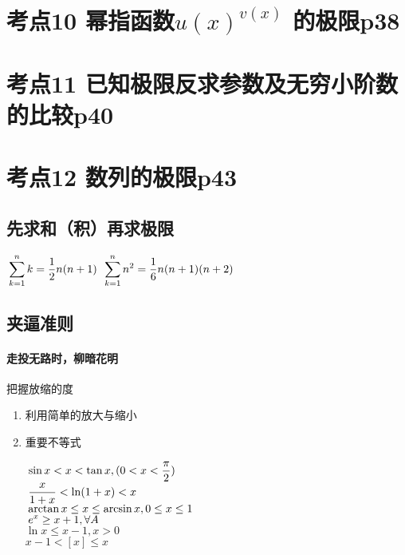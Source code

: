 \section{考点10 幂指函数\texorpdfstring{$u(x)^{v(x)}$}{} 的极限p38}

\section{考点11 已知极限反求参数及无穷小阶数的比较p40}

\section{考点12 数列的极限p43}

\subsection{先求和（积）再求极限}

\begin{tcolorbox}
    \newline
    \bigskip
    $\displaystyle\hspace{.2em}\sum_{k=1}^{n}k=\frac{1}{2}n(n+1)$\newline
    $\displaystyle\hspace{.2em}\sum_{k=1}^{n}n^2=\frac{1}{6}n(n+1)(n+2)$
    
\end{tcolorbox}

\subsection{夹逼准则}

\paragraph{走投无路时，柳暗花明}

把握放缩的度

\begin{enumerate}
    \item 利用简单的放大与缩小
    \item 重要不等式\begin{tcolorbox}
        $\displaystyle\hspace{.2em}\sin x<x<\tan x,(0<x<\frac{\pi}{2})$\\
        $\displaystyle\hspace{.2em}\frac{x}{1+x}<\ln (1+x)<x$\\
        $\displaystyle\hspace{.2em}\arctan x\le x\le \arcsin x,0\le x\le 1$\\
        $\displaystyle\hspace{.2em}e^x\ge x+1,\forall A$\\
        $\ln x\le x-1,x>0$\\
        $x-1<[x]\le x$
    \end{tcolorbox}
\end{enumerate}

